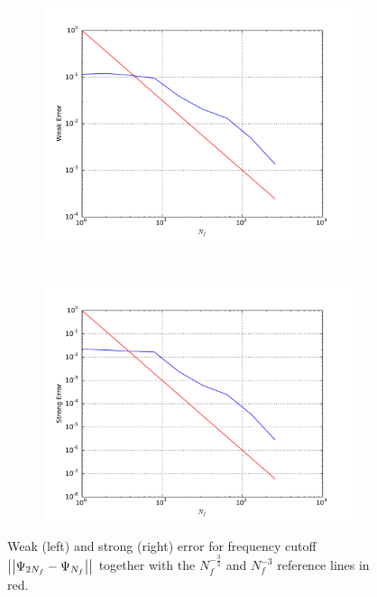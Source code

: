 \documentclass[11pt]{amsart}
\begin{document}
\begin{figure}
    \centering
    \begin{subfigure}[b]{0.4\textwidth}
        \includegraphics[width=\textwidth]{weakerr2.pdf}
    \end{subfigure}
    ~ %
    \begin{subfigure}[b]{0.4\textwidth}
        \includegraphics[width=\textwidth]{strongerr2.pdf}
    \end{subfigure}
    \caption{\label{img:rateFig3} Weak (left) and strong (right) error
    for frequency cutoff
    $\left| {\left| {{\Psi_{2N_f}-\Psi_{N_f}}} \right|} \right|_{}$ together with the $N_f^{-\frac{3}{2}}$ and
    $N_f^{-3}$ reference lines in red.}
\end{figure}
\end{document}
